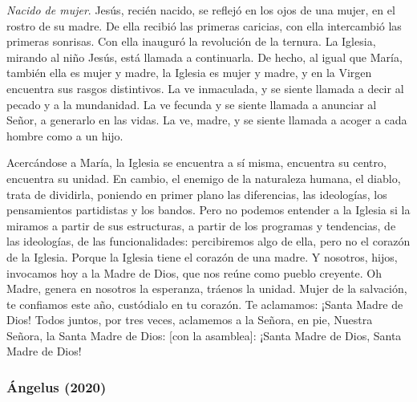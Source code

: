 \begin{body}
	\emph{Nacido de mujer}. Jesús, recién nacido, se reflejó en los ojos de una mujer, en el rostro de su madre. De ella recibió las primeras caricias, con ella intercambió las primeras sonrisas. Con ella inauguró la revolución de la ternura. La Iglesia, mirando al niño Jesús, está llamada a continuarla. De hecho, al igual que María, también ella es mujer y madre, la Iglesia es mujer y madre, y en la Virgen encuentra sus rasgos distintivos. La ve inmaculada, y se siente llamada a decir  al pecado y a la mundanidad. La ve fecunda y se siente llamada a anunciar al Señor, a generarlo en las vidas. La ve, madre, y se siente llamada a acoger a cada hombre como a un hijo.
	
	Acercándose a María, la Iglesia se encuentra a sí misma, encuentra su centro, encuentra su unidad. En cambio, el enemigo de la naturaleza humana, el diablo, trata de dividirla, poniendo en primer plano las diferencias, las ideologías, los pensamientos partidistas y los bandos. Pero no podemos entender a la Iglesia si la miramos a partir de sus estructuras, a partir de los programas y tendencias, de las ideologías, de las funcionalidades: percibiremos algo de ella, pero no el corazón de la Iglesia. Porque la Iglesia tiene el corazón de una madre. Y nosotros, hijos, invocamos hoy a la Madre de Dios, que nos reúne como pueblo creyente. Oh Madre, genera en nosotros la esperanza, tráenos la unidad. Mujer de la salvación, te confiamos este año, custódialo en tu corazón. Te aclamamos: ¡Santa Madre de Dios! Todos juntos, por tres veces, aclamemos a la Señora, en pie, Nuestra Señora, la Santa Madre de Dios: {[}con la asamblea{]}: ¡Santa Madre de Dios, Santa Madre de Dios!
\end{body}


\subsubsection{Ángelus (2020)} 


